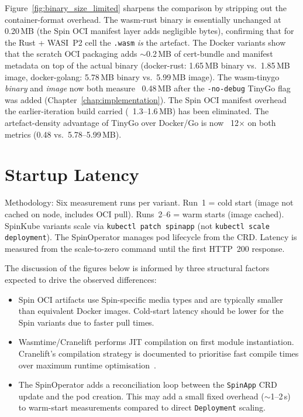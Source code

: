 \begin{sloppypar}
Figure~\ref{fig:binary_size_limited} sharpens the comparison by stripping out the container-format overhead. The wasm-rust binary is essentially unchanged at 0.20\,\acs{MB} (the Spin \acs{OCI} manifest layer adds negligible bytes), confirming that for the Rust + WASI~P2 cell the \texttt{.wasm} \textit{is} the artefact. The Docker variants show that the scratch \acs{OCI} packaging adds $\sim$0.2\,\acs{MB} of cert-bundle and manifest metadata on top of the actual binary (docker-rust: 1.65\,\acs{MB} binary vs.\ 1.85\,\acs{MB} image, docker-golang: 5.78\,\acs{MB} binary vs.\ 5.99\,\acs{MB} image). The wasm-tinygo \textit{binary} and \textit{image} now both measure ~0.48\,\acs{MB} after the \texttt{-no-debug} TinyGo flag was added (Chapter~\ref{chap:implementation}). The Spin \acs{OCI} manifest overhead the earlier-iteration build carried (~1.3--1.6\,\acs{MB}) has been eliminated. The artefact-density advantage of TinyGo over Docker/Go is now ~12$\times$ on both metrics (0.48 vs.\ 5.78--5.99\,\acs{MB}).
\end{sloppypar}

\section{Startup Latency}
\label{sec:eval_startup}

\begin{sloppypar}
Methodology: Six measurement runs per variant. Run~1 = cold start (image not cached on node, includes \acs{OCI} pull). Runs~2--6 = warm starts (image cached). SpinKube variants scale via \texttt{kubectl patch spinapp} (not \texttt{kubectl scale deployment}). The SpinOperator manages pod lifecycle from the \acs{CRD}. Latency is measured from the scale-to-zero command until the first \acs{HTTP}~200 response.
\end{sloppypar}

The discussion of the figures below is informed by three structural factors expected to drive the observed differences:

\begin{itemize}
    \item Spin \acs{OCI} artifacts use Spin-specific media types and are typically smaller than equivalent Docker images. Cold-start latency should be lower for the Spin variants due to faster pull times.
    \item Wasmtime/Cranelift performs \acs{JIT} compilation on first module instantiation. Cranelift's compilation strategy is documented to prioritise fast compile times over maximum runtime optimisation~\cite{bytecodealliance2024wasmtime, fastly2020lucetwasm}.
    \item \begin{sloppypar}The SpinOperator adds a reconciliation loop between the \texttt{SpinApp} \acs{CRD} update and the pod creation. This may add a small fixed overhead ($\sim$1--2\,s) to warm-start measurements compared to direct \texttt{Deployment} scaling.\end{sloppypar}
\end{itemize}

